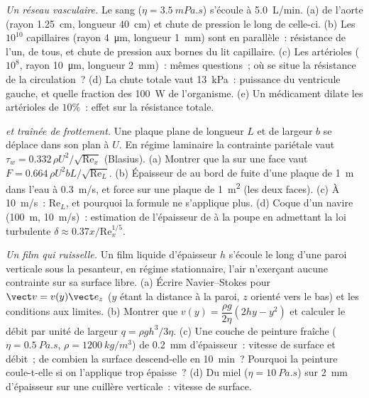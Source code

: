 \begin{exercise}[$\star\star\star$]\label{exo:b2:viscous-flows:10}
\emph{Un réseau vasculaire.} Le sang ($\eta = \qty{3.5}{mPa.s}$) s'écoule à
\qty{5.0}{L/min}. (a)  de l'aorte (rayon \qty{1.25}{cm},
longueur \qty{40}{cm}) et chute de pression le long de celle-ci. (b) Les $10^{10}$
capillaires (rayon \qty{4}{\micro m}, longueur \qty{1}{mm}) sont en parallèle~:
résistance de l'un, de tous, et chute de pression aux bornes du lit
capillaire. (c) Les artérioles ($10^8$, rayon \qty{10}{\micro m}, longueur
\qty{2}{mm})~: mêmes questions~; où se situe la résistance de la circulation~?
(d) La chute totale vaut \qty{13}{kPa}~: puissance du ventricule gauche,
et quelle fraction des \qty{100}{W} de l'organisme. (e) Un médicament dilate les
artérioles de $10\%$~: effet sur la résistance totale.
\end{exercise}

\begin{exercise}[$\star\star\star$]\label{exo:b2:viscous-flows:11}
\emph{ et traînée de frottement.} Une plaque plane de longueur $L$ et de
largeur $b$ se déplace dans son plan à $U$. En régime laminaire la contrainte pariétale
vaut $\tau_w = 0.332\,\rho U^2/\sqrt{\mathrm{Re}_x}$ (Blasius). (a) Montrer que
la  sur une face vaut $F = 0.664\,\rho U^2bL/\sqrt{\mathrm{Re}_L}$.
(b) Épaisseur de  au bord de fuite d'une plaque de \qty{1}{m}
dans l'eau à \qty{0.3}{m/s}, et force sur une plaque de \qty{1}{m^2} (les deux
faces). (c) À \qty{10}{m/s}~: $\mathrm{Re}_L$, et pourquoi la formule ne
s'applique plus. (d) Coque d'un navire (\qty{100}{m}, \qty{10}{m/s})~: estimation de l'épaisseur
de  à la poupe en admettant la loi turbulente $\delta \approx
0.37x/\mathrm{Re}_x^{1/5}$.
\end{exercise}

\begin{exercise}[$\star\star\star$]\label{exo:b2:viscous-flows:12}
\emph{Un film qui ruisselle.} Un film liquide d'épaisseur $h$ s'écoule le long d'une
paroi verticale sous la pesanteur, en régime stationnaire, l'air n'exerçant aucune contrainte sur
sa surface libre. (a) Écrire Navier--Stokes pour $\vect v = v(y)\vect e_z$ ($y$
étant la distance à la paroi, $z$ orienté vers le bas) et les conditions aux limites.
(b) Montrer que $v(y) = \dfrac{\rho g}{2\eta}(2hy - y^2)$ et calculer le débit
par unité de largeur $q = \rho gh^3/3\eta$. (c) Une couche de peinture fraîche ($\eta =
\qty{0.5}{Pa.s}$, $\rho = \qty{1200}{kg/m^3}$) de \qty{0.2}{mm} d'épaisseur~: vitesse
de surface et débit~; de combien la surface descend-elle en \qty{10}{min}~? Pourquoi
la peinture coule-t-elle si on l'applique trop épaisse~? (d) Du miel ($\eta = \qty{10}{Pa.s}$)
sur \qty{2}{mm} d'épaisseur sur une cuillère verticale~: vitesse de surface.
\end{exercise}

